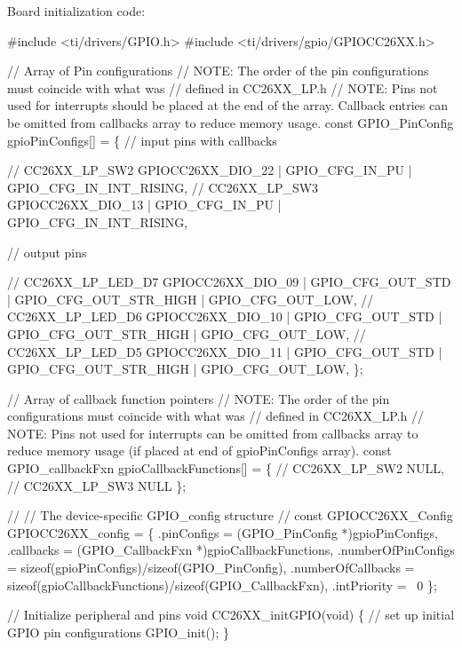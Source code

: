 Board initialization code\+: 
\begin{DoxyCode}
\textcolor{preprocessor}{#include <ti/drivers/GPIO.h>}
\textcolor{preprocessor}{#include <ti/drivers/gpio/GPIOCC26XX.h>}

\textcolor{comment}{// Array of Pin configurations}
\textcolor{comment}{// NOTE: The order of the pin configurations must coincide with what was}
\textcolor{comment}{//       defined in CC26XX\_LP.h}
\textcolor{comment}{// NOTE: Pins not used for interrupts should be placed at the end of the}
         array.  Callback entries can be omitted from callbacks array to
         reduce memory usage.
const GPIO_PinConfig gpioPinConfigs[] = \{
    \textcolor{comment}{// input pins with callbacks}

    \textcolor{comment}{// CC26XX\_LP\_SW2}
    GPIOCC26XX_DIO_22 | GPIO_CFG_IN_PU | GPIO_CFG_IN_INT_RISING,
    \textcolor{comment}{// CC26XX\_LP\_SW3}
    GPIOCC26XX_DIO_13 | GPIO_CFG_IN_PU | GPIO_CFG_IN_INT_RISING,

    \textcolor{comment}{// output pins}

    \textcolor{comment}{// CC26XX\_LP\_LED\_D7}
    GPIOCC26XX_DIO_09 | GPIO_CFG_OUT_STD | GPIO_CFG_OUT_STR_HIGH | 
      GPIO_CFG_OUT_LOW,
    \textcolor{comment}{// CC26XX\_LP\_LED\_D6}
    GPIOCC26XX_DIO_10 | GPIO_CFG_OUT_STD | GPIO_CFG_OUT_STR_HIGH | 
      GPIO_CFG_OUT_LOW,
    \textcolor{comment}{// CC26XX\_LP\_LED\_D5}
    GPIOCC26XX_DIO_11 | GPIO_CFG_OUT_STD | GPIO_CFG_OUT_STR_HIGH | 
      GPIO_CFG_OUT_LOW,
\};

\textcolor{comment}{// Array of callback function pointers}
\textcolor{comment}{// NOTE: The order of the pin configurations must coincide with what was}
\textcolor{comment}{//       defined in CC26XX\_LP.h}
\textcolor{comment}{// NOTE: Pins not used for interrupts can be omitted from callbacks array to}
         reduce memory usage (\textcolor{keywordflow}{if} placed at end of gpioPinConfigs array).
const GPIO\_callbackFxn gpioCallbackFunctions[] = \{
    \textcolor{comment}{// CC26XX\_LP\_SW2}
    NULL,
    \textcolor{comment}{// CC26XX\_LP\_SW3}
    NULL
\};

\textcolor{comment}{//}
\textcolor{comment}{// The device-specific GPIO\_config structure}
\textcolor{comment}{//}
\textcolor{keyword}{const} GPIOCC26XX_Config GPIOCC26XX\_config = \{
    .pinConfigs = (GPIO_PinConfig *)gpioPinConfigs,
    .callbacks = (GPIO_CallbackFxn *)gpioCallbackFunctions,
    .numberOfPinConfigs =
             \textcolor{keyword}{sizeof}(gpioPinConfigs)/\textcolor{keyword}{sizeof}(GPIO_PinConfig),
    .numberOfCallbacks =
             \textcolor{keyword}{sizeof}(gpioCallbackFunctions)/\textcolor{keyword}{sizeof}(GPIO_CallbackFxn),
    .intPriority = ~0
\};

\textcolor{comment}{// Initialize peripheral and pins}
\textcolor{keywordtype}{void} CC26XX\_initGPIO(\textcolor{keywordtype}{void})
\{
    \textcolor{comment}{// set up initial GPIO pin configurations}
    GPIO_init();
\}
\end{DoxyCode}


